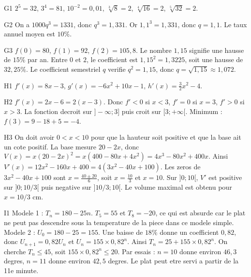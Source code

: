 \documentclass[11pt,a4paper]{article}
\begin{document}
\begin{corrige}{G1}
$2^5=32$, $3^4=81$, $10^{-2}=0,01$, $\sqrt[3]{8}=2$, $\sqrt[4]{16}=2$, $\sqrt[5]{32}=2$.
\end{corrige}

\begin{corrige}{G2}
On a $1000q^3=1331$, donc $q^3=1,331$. Or $1,1^3=1,331$, donc $q=1,1$. Le taux annuel moyen est $10\%$.
\end{corrige}

\begin{corrige}{G3}
$f(0)=80$, $f(1)=92$, $f(2)=105,8$. Le nombre $1,15$ signifie une hausse de $15\%$ par an. Entre $0$ et $2$, le coefficient est $1,15^2=1,3225$, soit une hausse de $32,25\%$. Le coefficient semestriel $q$ verifie $q^2=1,15$, donc $q=\sqrt{1,15}\approx1,072$.
\end{corrige}

\begin{corrige}{H1}
$f'(x)=8x-3$, $g'(x)=-6x^2+10x-1$, $h'(x)=\frac32x^2-4$.
\end{corrige}

\begin{corrige}{H2}
$f'(x)=2x-6=2(x-3)$. Donc $f'<0$ si $x<3$, $f'=0$ si $x=3$, $f'>0$ si $x>3$. La fonction decroit sur $]-\infty;3]$ puis croit sur $[3;+\infty[$. Minimum : $f(3)=9-18+5=-4$.
\end{corrige}

\begin{corrige}{H3}
On doit avoir $0<x<10$ pour que la hauteur soit positive et que la base ait un cote positif. La base mesure $20-2x$, donc $V(x)=x(20-2x)^2=x(400-80x+4x^2)=4x^3-80x^2+400x$. Ainsi $V'(x)=12x^2-160x+400=4(3x^2-40x+100)$. Les zeros de $3x^2-40x+100$ sont $x=\frac{40\pm20}{6}$, soit $x=\frac{10}{3}$ et $x=10$. Sur $]0;10[$, $V'$ est positive sur $]0;10/3[$ puis negative sur $]10/3;10[$. Le volume maximal est obtenu pour $x=10/3$ cm.
\end{corrige}

\begin{corrige}{I1}
Modele 1 : $T_n=180-25n$. $T_5=55$ et $T_8=-20$, ce qui est absurde car le plat ne peut pas descendre sous la temperature de la piece dans ce modele simple. Modele 2 : $U_0=180-25=155$. Une baisse de $18\%$ donne un coefficient $0,82$, donc $U_{n+1}=0,82U_n$ et $U_n=155\times0,82^n$. Ainsi $T_n=25+155\times0,82^n$. On cherche $T_n\leq45$, soit $155\times0,82^n\leq20$. Par essais : $n=10$ donne environ $46,3$ degres, $n=11$ donne environ $42,5$ degres. Le plat peut etre servi a partir de la 11e minute.
\end{corrige}
\end{document}

